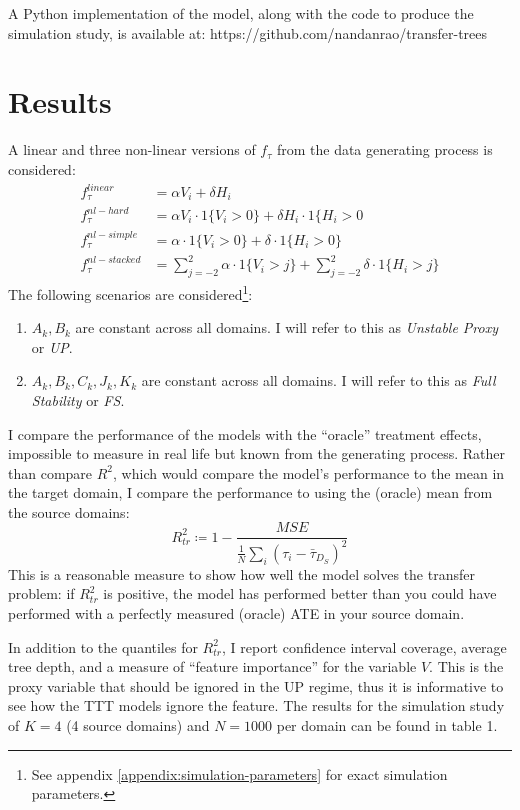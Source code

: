\documentclass[a4paper,12pt]{article}
\theoremstyle{proposition}
\begin{document}
A Python implementation of the model, along with the code to produce the simulation study, is available at: https://github.com/nandanrao/transfer-trees


%

\section{Results}

A linear and three non-linear versions of $f_{\tau}$ from the data generating process is considered:
%
\begin{align*}
f_{\tau}^{linear} &= \alpha V_i  + \delta H_i  \\
f_{\tau}^{nl-hard} &= \alpha V_i \cdot  1 \{ V_i > 0 \} + \delta H_i \cdot  1 \{ H_i > 0 \\
f_{\tau}^{nl-simple} &= \alpha \cdot  1 \{ V_i > 0 \}  +  \delta \cdot 1 \{ H_i > 0 \} \\
f_{\tau}^{nl-stacked} &= \sum_{j=-2}^2 \alpha \cdot  1 \{ V_i > j \}  +  \sum_{j=-2}^2 \delta \cdot 1 \{ H_i > j \}
\end{align*}
%
The following scenarios are considered\footnote{See appendix \ref{appendix:simulation-parameters} for exact simulation parameters.}:
%
\begin{enumerate}
\item $A_{k}, B_{k}$ are constant across all domains. I will refer to this as \textit{Unstable Proxy} or \textit{UP}.
\item $A_{k}, B_{k}, C_{k}, J_{k}, K_{k}$ are constant across all domains. I will refer to this as \textit{Full Stability} or \textit{FS}.
\end{enumerate}
%
I compare the performance of the models with the ``oracle'' treatment effects, impossible to measure in real life but known from the generating process. Rather than compare $R^2$, which would compare the model's performance to the mean in the target domain, I compare the performance to using the (oracle) mean from the source domains:
%
$$
R^2_{tr} \coloneqq 1 - \frac{MSE}{\frac{1}{N} \sum_i (\tau_i - \bar{\tau}_{D_S})^2}
$$
%
This is a reasonable measure to show how well the model solves the transfer problem: if $R^2_{tr}$ is positive, the model has performed better than you could have performed with a perfectly measured (oracle) ATE in your source domain.

In addition to the quantiles for $R^2_{tr}$, I report confidence interval coverage, average tree depth, and a measure of ``feature importance'' for the variable $V$. This is the proxy variable that should be ignored in the UP regime, thus it is informative to see how the TTT models ignore the feature. The results for the simulation study of $K=4$ (4 source domains) and $N=1000$ per domain can be found in table 1.
\end{document}
